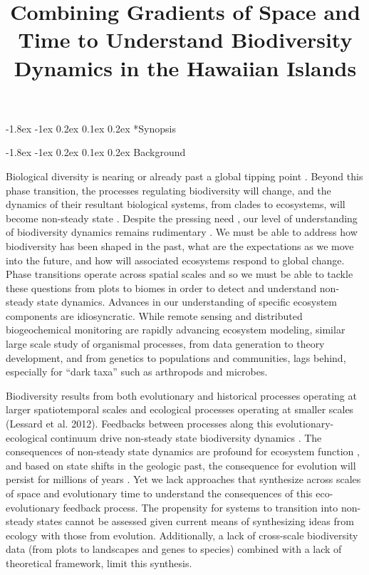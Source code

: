 \documentclass[11pt]{article}
\title{Combining Gradients of Space and Time to Understand Biodiversity Dynamics in the Hawaiian Islands \vspace{-1.5ex}}
\author{}
\date{}
\makeatletter
\renewcommand\section{\@startsection{section}{1}{\z@}%
                                  {-1.8ex \@plus -1ex \@minus 0.2ex}%
                                  {0.1ex \@plus 0.2ex}%
                                  {\normalfont\Large\bfseries}}
\makeatother
\begin{document}
\maketitle
\thispagestyle{fancy} 
\vspace{-4em}


\section*{Synopsis}


\section{Background}

Biological diversity is nearing or already past a global tipping point
\citep{barnosky2012}. Beyond this phase transition, the processes
regulating biodiversity will change, and the dynamics of their
resultant biological systems, from clades to ecosystems, will become
non-steady state \citep{barnosky, boettinger}.  Despite the pressing
need , our level of understanding of biodiversity dynamics remains
rudimentary .  We must be able to address how biodiversity has been
shaped in the past, what are the expectations as we move into the
future, and how will associated ecosystems respond to global
change. Phase transitions operate across spatial scales and so we must
be able to tackle these questions from plots to biomes in order to
detect and understand non-steady state dynamics. Advances in our
understanding of specific ecosystem components are idiosyncratic.
While remote sensing and distributed biogeochemical monitoring
\citep{asner, NEON} are rapidly advancing ecosystem modeling, similar
large scale study of organismal processes, from data generation to
theory development, and from genetics to populations and communities,
lags behind, especially for ``dark taxa'' such as arthropods and
microbes.

Biodiversity results from both evolutionary and historical processes
operating at larger spatiotemporal scales and ecological processes
operating at smaller scales (Lessard et al. 2012).  Feedbacks between
processes along this evolutionary-ecological continuum drive
non-steady state biodiversity dynamics \citep{brown1971,
  ricklefsNeutral, rosindell, rominger2015}. The consequences of
non-steady state dynamics are profound for ecosystem function
\citep{XXX}, and based on state shifts in the geologic past, the
consequence for evolution will persist for millions of years
\cite{erwin}. Yet we lack approaches that synthesize across scales of
space and evolutionary time to understand the consequences of this
eco-evolutionary feedback process.  The propensity for systems to
transition into non-steady states cannot be assessed given current
means of synthesizing ideas from ecology with those from evolution.
Additionally, a lack of cross-scale biodiversity data (from plots to
landscapes and genes to species) combined with a lack of theoretical
framework, limit this synthesis.
\end{document}
